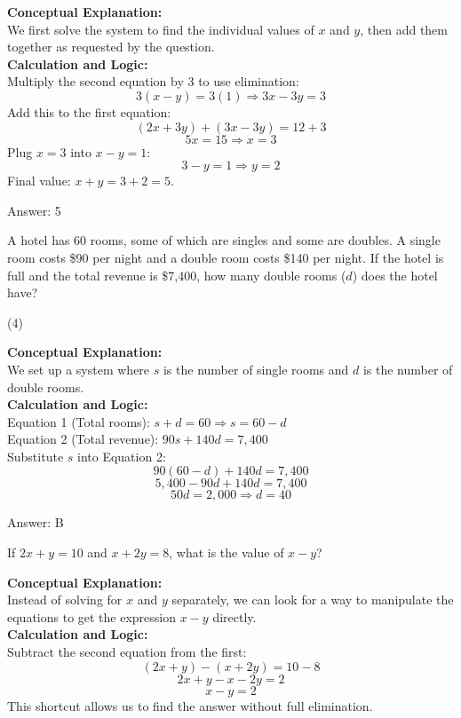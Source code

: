 \documentclass[11pt,paper=a4,answers]{exam}
\begin{document}
\begin{questions}
\begin{solution}
\textbf{Conceptual Explanation:} \\
We first solve the system to find the individual values of $x$ and $y$, then add them together as requested by the question.
\\[10pt]
\textbf{Calculation and Logic:} \\
Multiply the second equation by 3 to use elimination:
\[3(x - y) = 3(1) \Rightarrow 3x - 3y = 3\]
Add this to the first equation:
\[(2x + 3y) + (3x - 3y) = 12 + 3\]
\[5x = 15 \Rightarrow x = 3\]
Plug $x = 3$ into $x - y = 1$:
\[3 - y = 1 \Rightarrow y = 2\]
Final value: $x + y = 3 + 2 = 5$.

\vspace{15pt}
Answer: \colorbox{yellow!100}{5}
\end{solution}



\question
A hotel has 60 rooms, some of which are singles and some are doubles. A single room costs \$90 per night and a double room costs \$140 per night. If the hotel is full and the total revenue is \$7,400, how many double rooms ($d$) does the hotel have?
\begin{tasks}(4)
\end{tasks}

\begin{solution}
\textbf{Conceptual Explanation:} \\
We set up a system where $s$ is the number of single rooms and $d$ is the number of double rooms.
\\[10pt]
\textbf{Calculation and Logic:} \\
Equation 1 (Total rooms): $s + d = 60 \Rightarrow s = 60 - d$ \\
Equation 2 (Total revenue): $90s + 140d = 7,400$ \\
Substitute $s$ into Equation 2:
\[90(60 - d) + 140d = 7,400\]
\[5,400 - 90d + 140d = 7,400\]
\[50d = 2,000 \Rightarrow d = 40\]

\vspace{15pt}
Answer: \colorbox{yellow!100}{B}
\end{solution}

\question
If $2x + y = 10$ and $x + 2y = 8$, what is the value of $x - y$?

\begin{solution}
\textbf{Conceptual Explanation:} \\
Instead of solving for $x$ and $y$ separately, we can look for a way to manipulate the equations to get the expression $x - y$ directly.
\\[10pt]
\textbf{Calculation and Logic:} \\
Subtract the second equation from the first:
\[(2x + y) - (x + 2y) = 10 - 8\]
\[2x + y - x - 2y = 2\]
\[x - y = 2\]
This shortcut allows us to find the answer without full elimination.


\end{solution}
\end{questions}
\end{document}
